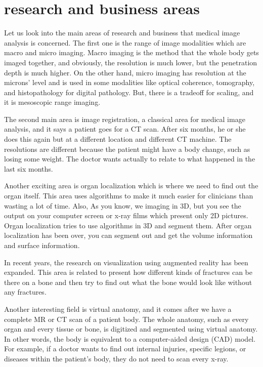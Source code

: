 \section{research and business areas}

Let us look into the main areas of research and business that medical image analysis is concerned. The first one is the range of image modalities which are macro and micro imaging. Macro imaging is the method that the whole body gets imaged together, and obviously, the resolution is much lower, but the penetration depth is much higher. On the other hand, micro imaging has resolution at the microns' level and is used in some modalities like optical coherence, tomography, and histopathology for digital pathology. But, there is a tradeoff for scaling, and it is mesoscopic range imaging.

The second main area is image registration, a classical area for medical image analysis, and it says a patient goes for a CT scan. After six months, he or she does this again but at a different location and different CT machine. The resolutions are different because the patient might have a body change, such as losing some weight. The doctor wants actually to relate to what happened in the last six months. 

Another exciting area is organ localization which is where we need to find out the organ itself. This area uses algorithms to make it much easier for clinicians than wasting a lot of time. Also, As you know, we imaging in 3D, but you see the output on your computer screen or x-ray films which present only 2D pictures. Organ localization tries to use algorithms in 3D and segment them. After organ localization has been over, you can segment out and get the volume information and surface information.

In recent years, the research on visualization using augmented reality has been expanded. This area is related to present how different kinds of fractures can be there on a bone and then try to find out what the bone would look like without any fractures. 

Another interesting field is virtual anatomy, and it comes after we have a complete MR or CT scan of a patient body. The whole anatomy, such as every organ and every tissue or bone, is digitized and segmented using virtual anatomy. In other words, the body is equivalent to a computer-aided design (CAD) model. For example, if a doctor wants to find out internal injuries, specific legions, or diseases within the patient's body, they do not need to scan every x-ray.  

